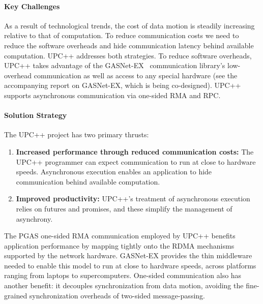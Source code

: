 \paragraph{Key  Challenges}

As a result of technological trends, the cost of data motion is steadily increasing relative to that of computation.  To reduce communication costs we need to 
reduce the software overheads and hide communication latency behind available computation. UPC++ addresses both strategies.
To reduce software overheads, UPC++ takes advantage of the GASNet-EX~\cite{gasnet-lcpc18,gasnet-site}
communication library's 
low-overhead communication as well as access to any special hardware
(see the accompanying report on GASNet-EX, which is being co-designed).
UPC++ supports asynchronous communication via one-sided RMA and RPC.



\paragraph{Solution Strategy}

The UPC++ project has two primary thrusts:
\begin{enumerate}
\item \textbf{Increased performance through reduced communication costs:} The
UPC++ programmer can expect communication to run at close to hardware speeds.
Asynchronous execution enables an application to hide communication behind
available computation.

\item \textbf{Improved productivity:}  UPC++'s treatment of asynchronous
execution relies on futures and promises, and these simplify the management of
asynchrony.

\end{enumerate}

The PGAS one-sided RMA communication employed by UPC++
benefits application  performance by mapping tightly onto the RDMA mechanisms
supported by the network hardware. GASNet-EX provides the
thin middleware
needed to enable this model to run at close to hardware speeds, across platforms ranging from laptops to supercomputers.
One-sided communication also has another benefit:
it decouples synchronization from data motion,
avoiding the fine-grained synchronization overheads of two-sided message-passing.

